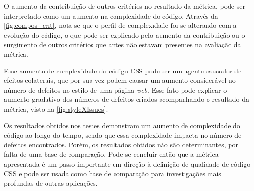 O aumento da contribuição de outros critérios no resultado da métrica, pode ser interpretado como um aumento na complexidade do código.  Através da \autoref{fig:compos_crit}, nota-se que o perfil de complexidade foi se alterando com a evolução do código, o que pode ser explicado pelo aumento da contribuição ou o surgimento de outros critérios que antes não estavam presentes na avaliação da métrica.

Esse aumento de complexidade do código CSS pode ser um agente causador de efeitos colaterais, que por sua vez podem causar um aumento considerável no número de defeitos no estilo de uma página \textit{web}. Esse fato pode explicar o aumento gradativo dos números de defeitos criados acompanhando o resultado da métrica, visto na \autoref{fig:styleXIssues}.

Os resultados obtidos nos testes demonstram um aumento de complexidade do código ao longo do tempo, sendo que essa complexidade impacta no número de defeitos encontrados. Porém, os resultados obtidos não são determinantes, por falta de uma base de comparação. Pode-se concluir então que a métrica apresentada é um passo importante em direção à definição de qualidade de código CSS e pode ser usada como base de comparação para investigações mais profundas de outras aplicações.